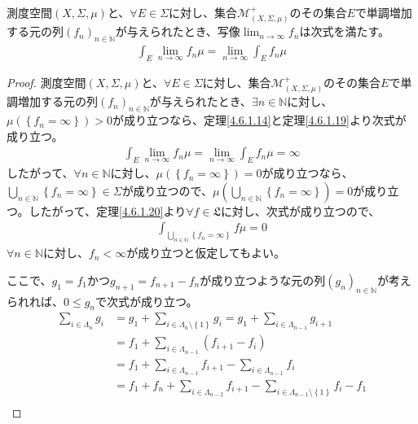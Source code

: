 \documentclass[dvipdfmx]{jsarticle}
\begin{document}
\begin{thm}\label{4.6.2.10}
測度空間$(X,\varSigma,\mu)$と、$\forall E \in \varSigma$に対し、集合$\mathcal{M}_{(X,\varSigma,\mu)}^{+}$のその集合$E$で単調増加する元の列$\left( f_{n} \right)_{n \in \mathbb{N}}$が与えられたとき、写像$\lim_{n \rightarrow \infty}f_{n}$は次式を満たす。
\begin{align*}
\int_{E} {\lim_{n \rightarrow \infty}f_{n}\mu} = \lim_{n \rightarrow \infty}{\int_{E} {f_{n}\mu}}
\end{align*}
\end{thm}
\begin{proof}
測度空間$(X,\varSigma,\mu)$と、$\forall E \in \varSigma$に対し、集合$\mathcal{M}_{(X,\varSigma,\mu)}^{+}$のその集合$E$で単調増加する元の列$\left( f_{n} \right)_{n \in \mathbb{N}}$が与えられたとき、$\exists n \in \mathbb{N}$に対し、$\mu\left( \left\{ f_{n} = \infty \right\} \right) > 0$が成り立つなら、定理\ref{4.6.1.14}と定理\ref{4.6.1.19}より次式が成り立つ。
\begin{align*}
\int_{E} {\lim_{n \rightarrow \infty}f_{n}\mu} = \lim_{n \rightarrow \infty}{\int_{E} {f_{n}\mu}} = \infty
\end{align*}
したがって、$\forall n \in \mathbb{N}$に対し、$\mu\left( \left\{ f_{n} = \infty \right\} \right) = 0$が成り立つなら、$\bigcup_{n \in \mathbb{N}} \left\{ f_{n} = \infty \right\} \in \varSigma$が成り立つので、$\mu\left( \bigcup_{n \in \mathbb{N}} \left\{ f_{n} = \infty \right\} \right) = 0$が成り立つ。したがって、定理\ref{4.6.1.20}より$\forall f \in \mathfrak{L}$に対し、次式が成り立つので、
\begin{align*}
\int_{\bigcup_{n \in \mathbb{N}} \left\{ f_{n} = \infty \right\}} {f\mu} = 0
\end{align*}
$\forall n \in \mathbb{N}$に対し、$f_{n} < \infty$が成り立つと仮定してもよい。\par
ここで、$g_{1} = f_{1}$かつ$g_{n + 1} = f_{n + 1} - f_{n}$が成り立つような元の列$\left( g_{n} \right)_{n \in \mathbb{N}}$が考えられれば、$0 \leq g_{n}$で次式が成り立つ。
\begin{align*}
\sum_{i \in \varLambda_{n}} g_{i} &= g_{1} + \sum_{i \in \varLambda_{n} \setminus \left\{ 1 \right\}} g_{i} = g_{1} + \sum_{i \in \varLambda_{n - 1}} g_{i + 1}\\
&= f_{1} + \sum_{i \in \varLambda_{n - 1}} \left( f_{i + 1} - f_{i} \right)\\
&= f_{1} + \sum_{i \in \varLambda_{n - 1}} f_{i + 1} - \sum_{i \in \varLambda_{n - 1}} f_{i}\\
&= f_{1} + f_{n} + \sum_{i \in \varLambda_{n - 2}} f_{i + 1} - \sum_{i \in \varLambda_{n - 1} \setminus \left\{ 1 \right\}} f_{i} - f_{1}\\

\end{align*}
\end{proof}
\end{document}
